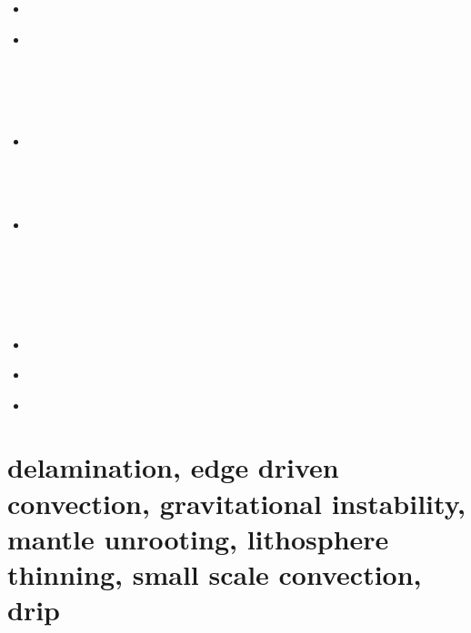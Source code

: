 \begin{small}
\begin{itemize}
 \\
 \\
\item[\twothousandsixteen] 
 \\
\item[\twothousandseventeen] 
 \\
 \\
 \\
 \\
 \\
\item[\twothousandeighteen]
 \\
 \\
 \\
 \\
\item[\twothousandnineteen] 
 \\
 \\
 \\
 \\
 \\
 \\
\item[\twothousandtwenty] 
\\
\item[\twothousandtwentythree] 
 \\
\item[\twothousandtwentyfour] 
\end{itemize}
\end{small}


\section{delamination, edge driven convection, gravitational instability, 
mantle unrooting, lithosphere thinning, small scale convection, drip} 

